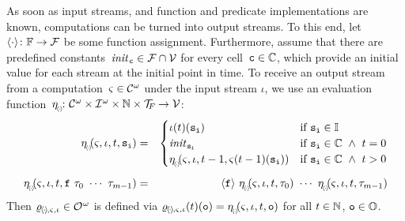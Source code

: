 As soon as input streams, and function and predicate implementations
are known, computations can be turned into output streams. To this
end, let $ \langle \cdot \rangle \colon \mathbb{F} \rightarrow \mathcal{F} $ be some
function assignment.  Furthermore, assume that there are predefined
constants~$ \textit{init}_{\hspace{1pt}{\text{\texttt{c}}}} \in \mathcal{F} \cap \mathcal{V} $ for every
cell~$ {\text{\texttt{c}}} \in \mathbb{C} $, which provide an initial
value for each stream at the initial point in time. To receive an
output stream from a computation~$ \varsigma \in \mathcal{C}^{\omega} $ under
the input stream $ \iota $, we use an evaluation
function~$ \eta_{_{\!\langle \hspace{-1pt} \cdot \hspace{-1pt} \rangle\!}}\! \colon \mathcal{C}^{\omega} \times
\mathcal{I}^{\hspace{0.2pt}\omega} \times \mathbb{N} \times \mathcal{T}_{\!F\hspace{-0.5pt}} \rightarrow
\mathcal{V} $:
%
\begin{eqnarray*}
  \eval(\comp, \iota, t, \name{s}_{\name{i}}) & = &
    \begin{cases}
      \iota(t)(\name{s}_{\name{i}}) & \text{if } \name{s}_{\name{i}} \in \inames \\
      \initsE &
      \text{if } \name{s}_{\name{i}} \in \cells \ \wedge \ t = 0 \\
      \eval(\comp, \iota, t-1, \comp(t-1)(\name{s}_{\name{i}})) &
      \text{if } \name{s}_{\name{i}} \in \cells \ \wedge \ t > 0
    \end{cases}
  \\[0.5em]
  \eval(\comp, \iota, t, \name{f} \ \term_{0} \ \cdots \ \term_{m-1}) & = &
  \assign{\name{f}} \ \eval(\comp,\iota, t,\term_{0}) \
  \cdots \ \eval(\comp,\iota, t,\term_{m-1})
\end{eqnarray*}
%
Then
$ \varrho_{\hspace{-1pt}\langle \hspace{-1pt}\cdot
  \hspace{-1pt}\rangle \hspace{-1pt}, \varsigma, \iota} \in
\mathcal{O}^{\hspace{0.5pt}\omega} $ is defined via
$ \varrho_{\hspace{-1pt}\langle \hspace{-1pt}\cdot
  \hspace{-1pt}\rangle \hspace{-1pt}, \varsigma, \iota}(t)({\text{\texttt{o}}}) =
\eta_{_{\!\langle \hspace{-1pt} \cdot \hspace{-1pt} \rangle\!}}\!(\varsigma, \iota, t, {\text{\texttt{o}}}) $ for all $ t \in \mathbb{N} $,
$ {\text{\texttt{o}}} \in \mathbb{O} $.

\medskip
\smallskip

